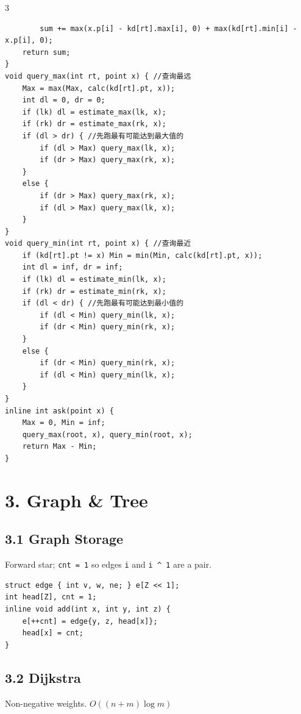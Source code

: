 \documentclass[8pt]{extarticle}
\begin{document}
\begin{multicols*}{3}
\begin{lstlisting}
        sum += max(x.p[i] - kd[rt].max[i], 0) + max(kd[rt].min[i] - x.p[i], 0);
    return sum;
}
void query_max(int rt, point x) { //查询最远
    Max = max(Max, calc(kd[rt].pt, x));
    int dl = 0, dr = 0;
    if (lk) dl = estimate_max(lk, x);
    if (rk) dr = estimate_max(rk, x);
    if (dl > dr) { //先跑最有可能达到最大值的
        if (dl > Max) query_max(lk, x);
        if (dr > Max) query_max(rk, x);
    }
    else {
        if (dr > Max) query_max(rk, x);
        if (dl > Max) query_max(lk, x);
    }
}
void query_min(int rt, point x) { //查询最近
    if (kd[rt].pt != x) Min = min(Min, calc(kd[rt].pt, x));
    int dl = inf, dr = inf;
    if (lk) dl = estimate_min(lk, x);
    if (rk) dr = estimate_min(rk, x);
    if (dl < dr) { //先跑最有可能达到最小值的
        if (dl < Min) query_min(lk, x);
        if (dr < Min) query_min(rk, x);
    }
    else {
        if (dr < Min) query_min(rk, x);
        if (dl < Min) query_min(lk, x);
    }
}
inline int ask(point x) {
    Max = 0, Min = inf;
    query_max(root, x), query_min(root, x);
    return Max - Min;
}
\end{lstlisting}

\section*{3. Graph \& Tree}

\subsection*{3.1 Graph Storage}

Forward star; \texttt{cnt = 1} so edges \texttt{i} and \texttt{i \textasciicircum{} 1} are a pair.


\begin{lstlisting}
struct edge { int v, w, ne; } e[Z << 1];
int head[Z], cnt = 1;
inline void add(int x, int y, int z) {
    e[++cnt] = edge{y, z, head[x]};
    head[x] = cnt;
}
\end{lstlisting}

\subsection*{3.2 Dijkstra}

Non-negative weights. $O((n + m) \log m)$



\end{multicols*}
\end{document}
